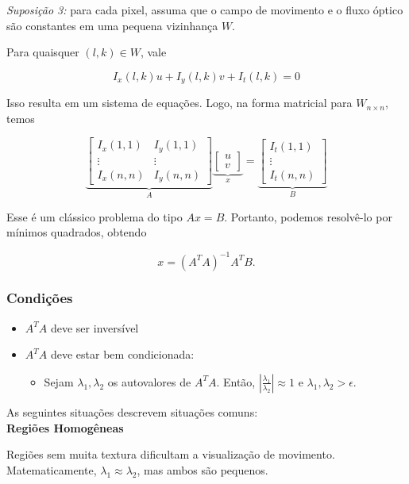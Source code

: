 \documentclass[12pt, a4paper]{article}
\begin{document}
\textit{Suposição 3:} para cada pixel, assuma que o campo de movimento e o fluxo óptico são constantes em uma pequena vizinhança $W$.

Para quaisquer $(l,k) \in W$, vale

\[ I_x(l,k) u + I_y(l,k) v + I_t(l,k)  = 0 \]

Isso resulta em um sistema de equações. Logo, na forma matricial para $W_{n\times n}$, temos

\[
\underbrace{
\begin{bmatrix}
I_x(1,1) & I_y(1,1) \\
\vdots & \vdots \\
I_x(n,n) & I_y(n,n)
\end{bmatrix}
}_{A}
\underbrace{
\begin{bmatrix}
u \\
v
\end{bmatrix}
}_{x}
=
\underbrace{
\begin{bmatrix}
I_t(1,1) \\
\vdots \\
I_t(n,n)
\end{bmatrix}
}_{B}
\]

Esse é um clássico problema do tipo $Ax=B$. Portanto, podemos resolvê-lo por mínimos quadrados, obtendo

\[
x = (A^T A)^{-1}A^TB.
\]

\subsubsection{Condições}

\begin{itemize}
    \item $A^TA$ deve ser inversível
    \item $A^TA$ deve estar bem condicionada:
    \begin{itemize}
        \item Sejam $\lambda_1, \lambda_2$ os autovalores de $A^TA$. Então, $|\frac{\lambda_1}{\lambda_2}| \approx 1$ e $\lambda_1, \lambda_2 > \epsilon$.
    \end{itemize}
\end{itemize}

As seguintes situações descrevem situações comuns: \\

\textbf{Regiões Homogêneas}

Regiões sem muita textura dificultam a visualização de movimento. Matematicamente, $\lambda_1 \approx \lambda_2$, mas ambos são pequenos. \\
\end{document}
